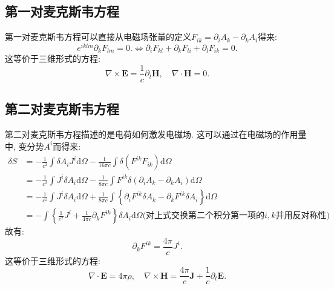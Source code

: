 \documentclass{article}
\newcommand\del{\partial}
\newcommand\bo[1]{\boldsymbol{#1}}
\renewcommand\d{\mathrm{d}}
\begin{document}
\subsection{第一对麦克斯韦方程}
第一对麦克斯韦方程可以直接从电磁场张量的定义$F_{ik}=\del_i A_k-\del_k A_i$得来:
\[\boxed{e^{iklm}\del_k F_{lm}=0.}\Leftrightarrow\boxed{\del_iF_{kl}+\del_kF_{li}+\del_lF_{ik}=0.}\]
这等价于三维形式的方程:
\[\nabla\times\bo{E}=\frac{1}{c}\del_t\bo{H},\quad\nabla\cdot\bo{H}=0.\]
\subsection{第二对麦克斯韦方程}
第二对麦克斯韦方程描述的是电荷如何激发电磁场. 这可以通过在电磁场的作用量中, 变分势$A^i$而得来:
\begin{align*}
    \delta S&=-\frac{1}{c^2}\int\delta A_iJ^i\d\Omega-\frac{1}{16\pi c}\int\delta\left(F^{ik}F_{ik}\right)\d\Omega\\
    &=-\frac{1}{c^2}\int J^i\delta A_i\d\Omega-\frac{1}{8\pi c}\int F^{ik}\delta\left(\del_iA_k-\del_kA_i\right)\d\Omega\\
    &=-\frac{1}{c^2}\int J^i\delta A_i\d\Omega+\frac{1}{8\pi c}\int\left\{\del_iF^{ik}\delta A_k-\del_kF^{ik}\delta A_i\right\}\d\Omega\\
    &=-\int\left\{\frac{1}{c^2}J^i+\frac{1}{4\pi c}\del_kF^{ik}\right\}\delta A_i\d\Omega\text{(对上式交换第二个积分第一项的$i,k$并用反对称性)}
\end{align*}
故有:
\[\boxed{\del_kF^{ik}=\frac{4\pi}{c}J^i.}\]
这等价于三维形式的方程:
\[\nabla\cdot\bo{E}=4\pi\rho,\quad\nabla\times\bo{H}=\frac{4\pi}{c}\bo{J}+\frac{1}{c}\del_t\bo{E}.\]
\end{document}
